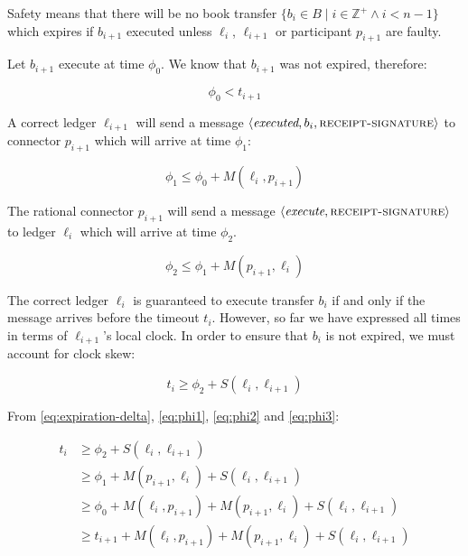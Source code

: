\documentclass[letterpaper,twocolumn,10pt]{article}
\begin{document}

Safety means that there will be no book transfer $ \{ b_i \in B \mid i \in \mathbb{Z}^+ \land i < n-1 \} $ which expires if $b_{i+1}$ executed unless $\ell_i$, $\ell_{i+1}$ or participant $p_{i+1}$ are faulty.

Let $b_{i+1}$ execute at time $\phi_0$. We know that $b_{i+1}$ was not expired, therefore:

\begin{equation}
\label{eq:phi0}
\phi_0 < t_{i+1}
\end{equation}

A correct ledger $\ell_{i+1}$ will send a message $\langle\textit{executed}, b_i, \textsc{receipt-signature}\rangle$ to connector $p_{i+1}$ which will arrive at time $\phi_1$:

\begin{equation}
\label{eq:phi1}
\phi_1 \leq \phi_0 + M(\ell_i, p_{i+1})
\end{equation}

The rational connector $p_{i+1}$ will send a message $\langle\textit{execute}, \textsc{receipt-signature}\rangle$ to ledger $\ell_i$ which will arrive at time $\phi_2$.

\begin{equation}
\label{eq:phi2}
\phi_2 \leq \phi_1 + M(p_{i+1}, \ell_i)
\end{equation}

The correct ledger $\ell_i$ is guaranteed to execute transfer $b_i$ if and only if the message arrives before the timeout $t_i$. However, so far we have expressed all times in terms of $\ell_{i+1}$'s local clock. In order to ensure that $b_i$ is not expired, we must account for clock skew:

\begin{equation}
\label{eq:phi3}
t_i \geq \phi_2 + S(\ell_i, \ell_{i+1})
\end{equation}

From \ref{eq:expiration-delta}, \ref{eq:phi1}, \ref{eq:phi2} and \ref{eq:phi3}:

\begin{equation}
\begin{split}
t_i & \geq \phi_2 + S(\ell_i, \ell_{i+1}) \\
    & \geq \phi_1 + M(p_{i+1}, \ell_i) + S(\ell_i, \ell_{i+1}) \\
    & \geq \phi_0 + M(\ell_i, p_{i+1}) + M(p_{i+1}, \ell_i) + S(\ell_i, \ell_{i+1}) \\
    & \geq t_{i+1} + M(\ell_i, p_{i+1}) + M(p_{i+1}, \ell_i) + S(\ell_i, \ell_{i+1})
\end{split}
\end{equation}
\end{document}
